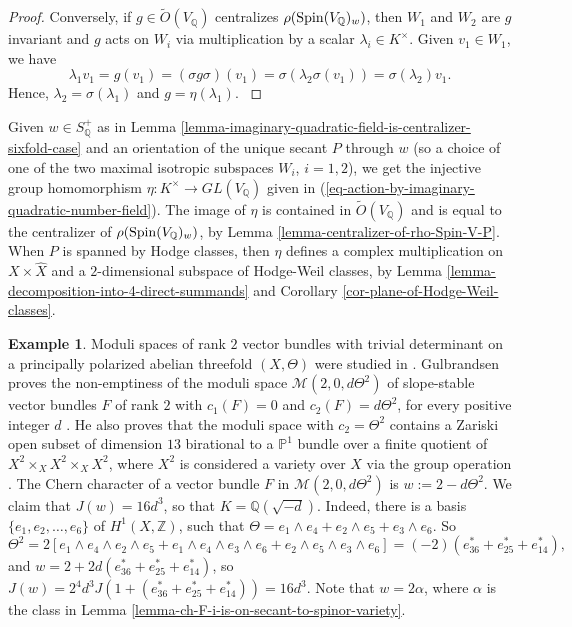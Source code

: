 \documentclass[12pt]{amsart}
\numberwithin{equation}{subsection}
\theoremstyle{plain}
\theoremstyle{definition}
\newtheorem{example}[thm]{Example}
\newcommand{\QQ}{{\mathbb Q}}
\newcommand{\M}{{\mathcal M}}
\newcommand{\PP}{{\mathbb P}}
\newcommand{\cm}{\eta}
\newcommand{\Integers}{{\mathbb Z}}
\newcommand{\Spin}{{\rm Spin}}
\begin{document}
\begin{proof}
{Conversely, if $g\in\tilde{O}(V_\QQ)$  centralizes $\rho(\Spin(V_\QQ)_w)$,
then $W_1$ and $W_2$ are $g$ invariant and $g$ acts on $W_i$ via multiplication by a scalar $\lambda_i\in K^\times$. Given $v_1\in W_1$, we have
\[
\lambda_1v_1=g(v_1)=(\sigma g\sigma)(v_1)=\sigma(\lambda_2\sigma(v_1))=\sigma(\lambda_2)v_1.
\]
Hence, $\lambda_2=\sigma(\lambda_1)$ and $g=\cm(\lambda_1)$.
}
\end{proof}

Given $w\in S^+_\QQ$ as in Lemma \ref{lemma-imaginary-quadratic-field-is-centralizer-sixfold-case} and an orientation of the unique secant $P$ through $w$ (so a choice of one of the two maximal isotropic subspaces $W_i$, $i=1,2$), we get the injective group homomorphism $\cm:K^\times\rightarrow GL(V_\QQ)$  given in (\ref{eq-action-by-imaginary-quadratic-number-field}). The image of $\cm$ is contained in $\tilde{O}(V_\QQ)$ and is equal to the centralizer of $\rho(\Spin(V_\QQ)_w)$, by Lemma \ref{lemma-centralizer-of-rho-Spin-V-P}. When $P$ is spanned by Hodge classes, then $\cm$ defines a complex multiplication on $X\times\hat{X}$ and a $2$-dimensional subspace of Hodge-Weil classes, by Lemma \ref{lemma-decomposition-into-4-direct-summands} and Corollary \ref{cor-plane-of-Hodge-Weil-classes}.


\begin{example}
\label{example-gulbrandsen}
Moduli spaces of rank $2$ vector bundles with trivial determinant on a principally polarized abelian threefold $(X,\Theta)$ were studied in \cite{gulbrandsen}. Gulbrandsen proves the non-emptiness of the moduli space $\M(2,0,d\Theta^2)$ 
of slope-stable vector bundles $F$ of rank $2$ with $c_1(F)=0$ and $c_2(F)=d\Theta^2$, for every positive integer $d$
\cite[Theorem 2.3]{gulbrandsen}. He also proves that 
the moduli space with $c_2=\Theta^2$ contains a Zariski open subset of dimension $13$ birational to a $\PP^1$ bundle over a finite quotient of
$X^2\times_X X^2\times_X X^2$, where $X^2$ is considered a variety over $X$ via the group operation
\cite[Theorem 6.1]{gulbrandsen}.
The Chern character of a vector bundle $F$ in $\M(2,0,d\Theta^2)$
is $w:=2-d\Theta^2$. We claim that $J(w)=16d^3$, so that $K=\QQ(\sqrt{-d})$. Indeed, there is a basis $\{e_1, e_2, \dots, e_6\}$ of $H^1(X,\Integers)$, such that $\Theta=e_1\wedge e_4+e_2\wedge e_5+ e_3\wedge e_6$. So 
\[
\Theta^2=2\left[e_1\wedge  e_4\wedge  e_2 \wedge  e_5+
e_1\wedge  e_4\wedge  e_3\wedge  e_6+
e_2\wedge  e_5\wedge  e_3\wedge  e_6\right]
= (-2)(e_{36}^*+e_{25}^*+e_{14}^*),
\] 
and $w=2+2d(e_{36}^*+e_{25}^*+e_{14}^*)$, so $J(w)=2^4d^3J(1+(e_{36}^*+e_{25}^*+e_{14}^*))=16d^3$. %
Note that $w=2\alpha$, where $\alpha$ is the class in Lemma \ref{lemma-ch-F-i-is-on-secant-to-spinor-variety}.
\end{example}
\end{document}
